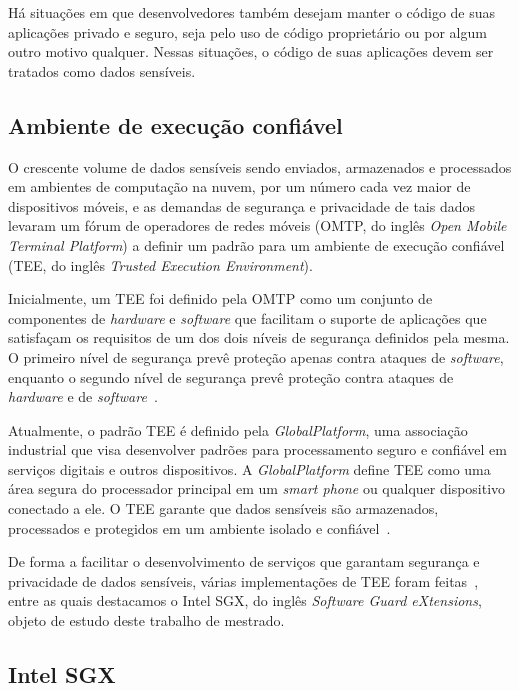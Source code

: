 Há situações em que desenvolvedores também desejam manter o código de suas
aplicações privado e seguro, seja pelo uso de código proprietário ou por algum
outro motivo qualquer. Nessas situações, o código de suas aplicações devem ser
tratados como dados sensíveis.

\subsection{Ambiente de execução confiável}
\label{subsec:intro_contextualizacao_tee}

O crescente volume de dados sensíveis sendo enviados, armazenados e processados
em ambientes de computação na nuvem, por um número cada vez maior de
dispositivos móveis, e as demandas de segurança e privacidade de tais dados
levaram um fórum de operadores de redes móveis (OMTP, do inglês \textit{Open
Mobile Terminal Platform}) a definir um padrão para um ambiente de execução
confiável (TEE, do inglês \textit{Trusted Execution Environment}).

Inicialmente, um TEE foi definido pela OMTP como um conjunto de componentes de
\textit{hardware} e \textit{software} que facilitam o suporte de aplicações que
satisfaçam os requisitos de um dos dois níveis de segurança definidos pela
mesma. O primeiro nível de segurança prevê proteção apenas contra ataques de
\textit{software}, enquanto o segundo nível de segurança prevê proteção contra
ataques de \textit{hardware} e de \textit{software}~\cite{omtpadvanced2009}.

Atualmente, o padrão TEE é definido pela \textit{GlobalPlatform}, uma associação
industrial que visa desenvolver padrões para processamento seguro e confiável
em serviços digitais e outros dispositivos. A \textit{GlobalPlatform} define TEE
como uma área segura do processador principal em um \textit{smart phone} ou
qualquer dispositivo conectado a ele. O TEE garante que dados sensíveis são
armazenados, processados e protegidos em um ambiente isolado e confiável~\cite
{globalplatform2017}.

De forma a facilitar o desenvolvimento de serviços que garantam segurança e
privacidade de dados sensíveis, várias implementações de TEE foram feitas~\cite
{omtpadvanced2009,logictrusted,trustonic2017,mccune2008flicker,amdSMESEV}, entre
as quais destacamos o Intel SGX, do inglês \textit{Software Guard eXtensions},
objeto de estudo deste trabalho de mestrado.

\subsection{Intel SGX}
\label{subsec:intro_contextualizacao_intel_sgx}

